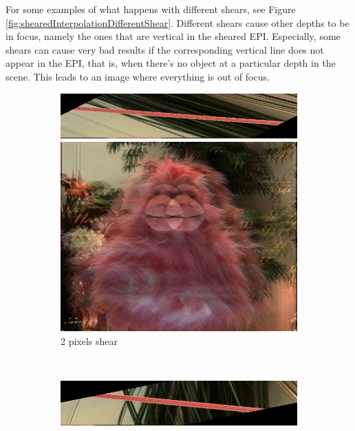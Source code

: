 \documentclass[a4paper]{article}
\begin{document}
For some examples of what happens with different shears, see Figure \ref{fig:shearedInterpolationDifferentShear}. Different shears cause other depths to be in focus, namely the ones that are vertical in the sheared EPI. Especially, some shears can cause very bad results if the corresponding vertical line does not appear in the EPI, that is, when there's no object at a particular depth in the scene. This leads to an image where everything is out of focus.
\begin{figure}[ht]
	\begin{subfigure}[h]{0.48\textwidth}
	  \includegraphics[width=\textwidth]{shear2}
	  
	  \vspace{2mm}
	  \includegraphics[width=\textwidth]{ShearedInterpolation58_62_shear2}
	  \caption*{2 pixels shear}
	\end{subfigure}
    	~
	\begin{subfigure}[h]{0.48\textwidth}
	  \centering
	  \includegraphics[width=\textwidth]{shear5}
	  

\end{subfigure}
\end{figure}
\end{document}
